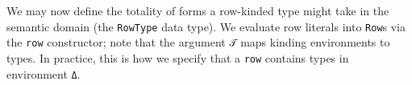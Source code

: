 \documentclass[authoryear, acmsmall, screen, review, nonacm]{acmart} %
\begin{document}
\Ni We may now define the totality of forms a row-kinded type might take in the semantic domain (the \verb!RowType! data type). We evaluate row literals into \verb!Row!s via the \verb!row! constructor; note that the argument \verb!𝒯! maps kinding environments to types. In practice, this is how we specify that a \verb!row! contains types in environment \verb!Δ!. 

\begin{code}%
\>[0]\AgdaSpace{}%
\AgdaSpace{}%
\AgdaSymbol{(}\AgdaSpace{}%
\AgdaSymbol{:}\AgdaSpace{}%
\AgdaSymbol{)}\AgdaSpace{}%
\AgdaSymbol{(}\AgdaSpace{}%
\AgdaSymbol{:}\AgdaSpace{}%
\AgdaSpace{}%
\AgdaSpace{}%
\AgdaSymbol{)}\AgdaSpace{}%
\AgdaSymbol{:}\AgdaSpace{}%
\AgdaSpace{}%
\AgdaSpace{}%
\<%
\\
\>[0]\AgdaSpace{}%
\AgdaSymbol{:}\AgdaSpace{}%
\AgdaSpace{}%
\AgdaSymbol{\{}\AgdaSpace{}%
\AgdaSymbol{:}\AgdaSpace{}%
\AgdaSymbol{\}}\AgdaSpace{}%
\AgdaSymbol{\{}\AgdaSpace{}%
\AgdaSymbol{:}\AgdaSpace{}%
\AgdaSpace{}%
\AgdaSpace{}%
\AgdaSymbol{\}}\AgdaSpace{}%
\AgdaSpace{}%
\AgdaSpace{}%
\AgdaSpace{}%
\AgdaSpace{}%
\AgdaOperator{\AgdaInductiveConstructor{R[}}\AgdaSpace{}%
\AgdaSpace{}%
\AgdaOperator{\AgdaInductiveConstructor{]}}\AgdaSpace{}%
\AgdaSpace{}%
\<%
\\
%
\\[\AgdaEmptyExtraSkip]%
\>[0]\AgdaSpace{}%
\AgdaSpace{}%
\AgdaSpace{}%
\AgdaSpace{}%
\<%
\\
\>[0][@{}l@{\AgdaIndent{0}}]%
\>[2]\AgdaSpace{}%
\AgdaSymbol{:}\AgdaSpace{}%
\AgdaSymbol{(}\AgdaSpace{}%
\AgdaSymbol{:}\AgdaSpace{}%
\AgdaSpace{}%
\AgdaSymbol{(}\AgdaSpace{}%
\AgdaSymbol{))}\AgdaSpace{}%
\AgdaSpace{}%
\AgdaSpace{}%
\AgdaSpace{}%
\AgdaSpace{}%
\AgdaSpace{}%
\AgdaSpace{}%
\AgdaSpace{}%
\AgdaOperator{\AgdaInductiveConstructor{R[}}\AgdaSpace{}%
\AgdaSpace{}%
\AgdaOperator{\AgdaInductiveConstructor{]}}\<%

\end{code}
\end{document}
